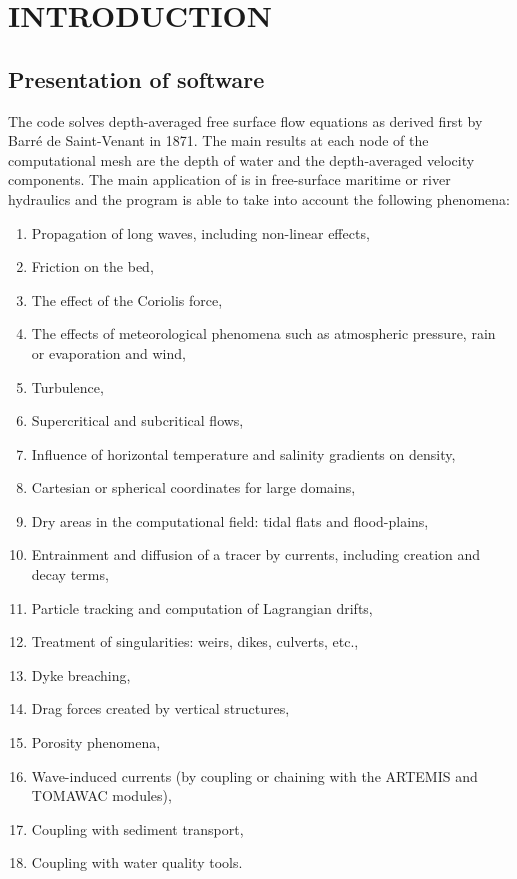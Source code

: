 \chapter{INTRODUCTION}
\label{ch:intro}


\section{Presentation of  software}

 The  code solves depth-averaged free surface flow equations as derived first by Barr\'{e} de Saint-Venant in 1871. The main results at each node of the computational mesh are the depth of water and the depth-averaged velocity components. The main application of  is in free-surface maritime or river hydraulics and the program is able to take into account the following phenomena:

\begin{enumerate}
\item  Propagation of long waves, including non-linear effects,
\item  Friction on the bed,
\item  The effect of the Coriolis force,
\item  The effects of meteorological phenomena such as atmospheric pressure, rain or evaporation and wind,
\item  Turbulence,
\item  Supercritical and subcritical flows,
\item  Influence of horizontal temperature and salinity gradients on density,
\item  Cartesian or spherical coordinates for large domains,
\item  Dry areas in the computational field: tidal flats and flood-plains,
\item  Entrainment and diffusion of a tracer by currents, including creation and decay terms,
\item  Particle tracking and computation of Lagrangian drifts,
\item  Treatment of singularities: weirs, dikes, culverts, etc.,
\item  Dyke breaching,
\item  Drag forces created by vertical structures,
\item  Porosity phenomena,
\item  Wave-induced currents (by coupling or chaining with the ARTEMIS and TOMAWAC modules),
\item  Coupling with sediment transport,
\item  Coupling with water quality tools.
\end{enumerate}

